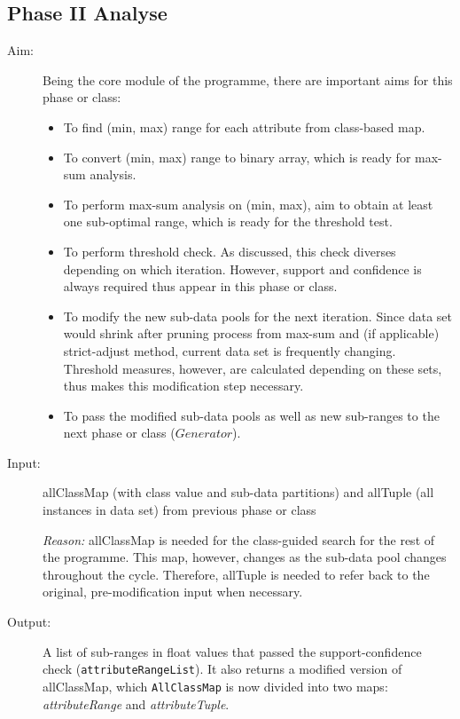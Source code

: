 \subsection{Phase II Analyse}

\begin{description}

\item[Aim: ] Being the core module of the programme, there are important aims for this phase or class:
\begin{itemize}
	\item{To find (min, max) range for each attribute from class-based map.} 
	\item{To convert (min, max) range to binary array, which is ready for max-sum analysis.} 
	\item{To perform max-sum analysis on (min, max), aim to obtain at least one sub-optimal range, which is ready for the threshold test.} 
	\item{To perform threshold check. As discussed, this check diverses depending on which iteration. However, support and confidence is always required thus appear in this phase or class.} 
	\item{To modify the new sub-data pools for the next iteration. Since data set would shrink after pruning process from max-sum and (if applicable) strict-adjust method, current data set is frequently changing. Threshold measures, however, are calculated depending on these sets, thus makes this modification step necessary.} 
	\item{To pass the modified sub-data pools as well as new sub-ranges to the next phase or class ($Generator$).} 
\end{itemize}


\item[Input: ] allClassMap (with class value and sub-data partitions) and allTuple (all instances in data set) from previous phase or class

\textit{Reason: } allClassMap is needed for the class-guided search for the rest of the programme. This map, however, changes as the sub-data pool changes throughout the cycle. Therefore, allTuple is needed to refer back to the original, pre-modification input when necessary.

\item[Output: ] A list of sub-ranges in float values that passed the support-confidence check (\texttt{attributeRangeList}). It also returns a modified version of allClassMap, which \texttt{AllClassMap} is now divided into two maps: \textit{attributeRange} and \textit{attributeTuple}.
  

\end{description}
